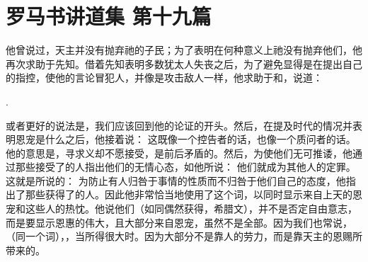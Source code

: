 

\section{罗马书讲道集 第十九篇}

\par

\par

他曾说过，天主并没有抛弃祂的子民；为了表明在何种意义上祂没有抛弃他们，他再次求助于先知。借着先知表明多数犹太人失丧之后，为了避免显得是在提出自己的指控，使他的言论冒犯人，并像是攻击敌人一样，他求助于和，说道：\par

.  \par

或者更好的说法是，我们应该回到他的论证的开头。然后，在提及时代的情况并表明恩宠是什么之后，他接着说： 这既像一个控告者的话，也像一个质问者的话。他的意思是，寻求义却不愿接受，是前后矛盾的。然后，为使他们无可推诿，他通过那些接受了的人指出他们的无情心态，如他所说： 他们就成为其他人的定罪。这就是所说的：  为防止有人归咎于事情的性质而不归咎于他们自己的态度，他指出了那些获得了的人。因此他非常恰当地使用了这个词，以同时显示来自上天的恩宠和这些人的热忱。他说他们（如同偶然获得，希腊文），并不是否定自由意志，而是要显示恩惠的伟大，且大部分来自恩宠，虽然不是全部。因为我们也常说，（同一个词），，当所得很大时。因为大部分不是靠人的劳力，而是靠天主的恩赐所带来的。\par

\par

